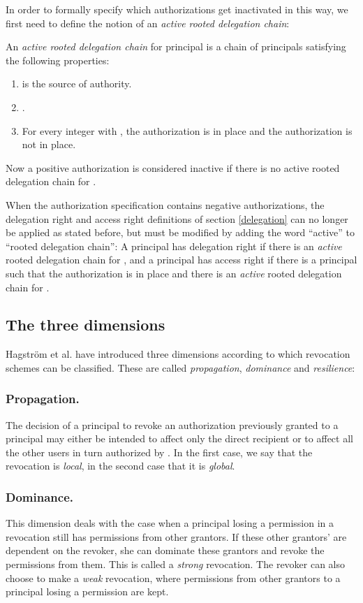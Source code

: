 \documentclass[runningheads]{llncs}
\begin{document}
In order to formally specify which authorizations get inactivated in this way, we first need to define the notion of an \emph{active rooted delegation chain}:
\begin{definition}
 An \emph{active rooted delegation chain} for principal  is a chain  of principals satisfying the following properties: 
 \begin{enumerate}
  \item  is the source of authority.
  \item .
  \item For every integer  with , the authorization  is in place and the authorization  is not in place.
 \end{enumerate}
\end{definition}
Now a positive authorization  is considered inactive if there is no active rooted delegation chain for . 

When the authorization specification contains negative authorizations, the delegation right and access right definitions of section \ref{delegation} can no longer be applied as stated before, but must be modified by adding the word ``active'' to ``rooted delegation chain'': A principal  has delegation right if there is an \emph{active} rooted delegation chain for , and a principal  has access right if there is a principal  such that the authorization  is in place and there is an \emph{active} rooted delegation chain for .

\subsection{The three dimensions}
Hagstr\"om et al. \cite{Hagstrom} have introduced three dimensions according to which revocation schemes can be classified. These are called \emph{propagation}, \emph{dominance} and \emph{resilience}:

\subsubsection{Propagation.} 
The decision of a principal  to revoke an authorization previously granted to a principal  may either be intended to affect only the direct recipient  or to affect all the other users in turn authorized by . In the first case, we say that the revocation is \emph{local}, in the second case that it is \emph{global}. 

\subsubsection{Dominance.} 
This dimension deals with the case when a principal losing a permission in a revocation still has permissions from other grantors. 
If these other grantors' are dependent on the revoker, she can dominate these grantors and revoke the permissions from them. This is called a \emph{strong} revocation. The revoker can also choose to make a \emph{weak} revocation, where permissions from other grantors to a principal losing a permission are kept. 
\end{document}
